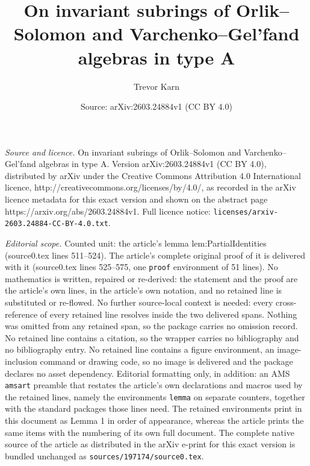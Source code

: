 \documentclass[10pt,a4paper]{amsart}
\title{On invariant subrings of Orlik--Solomon and Varchenko--Gel'fand algebras in type A}
\author{Trevor Karn}
\date{Source: arXiv:2603.24884v1 (CC BY 4.0)}
\begin{document}
\maketitle

\noindent\emph{Source and licence.} On invariant subrings of Orlik--Solomon and Varchenko--Gel'fand algebras in type A. Version arXiv:2603.24884v1 (CC BY 4.0), distributed by arXiv under the Creative Commons Attribution 4.0 International licence, http://creativecommons.org/licenses/by/4.0/, as recorded in the arXiv licence metadata for this exact version and shown on the abstract page https://arxiv.org/abs/2603.24884v1. Full licence notice: \texttt{licenses/arxiv-2603.24884-CC-BY-4.0.txt}.\par\smallskip

\noindent\textit{Editorial scope.} Counted unit: the article's lemma lem:PartialIdentities (source0.tex lines 511--524). The article's complete original proof of it is delivered with it (source0.tex lines 525--575, one \texttt{proof} environment of 51 lines). No mathematics is written, repaired or re-derived: the statement and the proof are the article's own lines, in the article's own notation, and no retained line is substituted or re-flowed.  No further source-local context is needed: every cross-reference of every retained line resolves inside the two delivered spans.  Nothing was omitted from any retained span, so the package carries no omission record.  No retained line contains a citation, so the wrapper carries no bibliography and no bibliography entry.  No retained line contains a figure environment, an image-inclusion command or drawing code, so no image is delivered and the package declares no asset dependency.  Editorial formatting only, in addition: an AMS \texttt{amsart} preamble that restates the article's own declarations and macros used by the retained lines, namely the environments \texttt{lemma} on separate counters, together with the standard packages those lines need.  The retained environments print in this document as Lemma 1 in order of appearance, whereas the article prints the same items with the numbering of its own full document.  The complete native source of the article as distributed in the arXiv e-print for this exact version is bundled unchanged as \texttt{sources/197174/source0.tex}.
\end{document}
